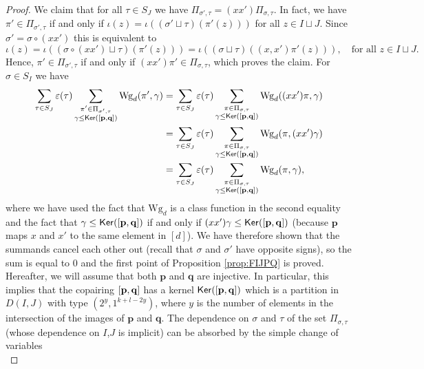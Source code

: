 \documentclass[11pt, a4paper, oneside, reqno]{amsart}
\newcommand{\copairpq}{{[{\bf p},{\bf q}]}}
\theoremstyle{remark}
\theoremstyle{definition}
\numberwithin{equation}{section}
\begin{document}
\begin{proof}
We claim that for all $\tau \in S_J$ we have $\Pi_{\sigma', \tau} = (xx')\Pi_{\sigma, \tau}$. In fact, we have $\pi' \in \Pi_{\sigma', \tau}$ if and only if $\iota(z) = \iota((\sigma'\sqcup\tau)(\pi'(z)))$ for all $z \in I \sqcup J$. Since $\sigma' = \sigma \circ (xx')$ this is equivalent to
$$
		\iota(z) = \iota((\sigma\circ (xx')\sqcup \tau)(\pi'(z))) = \iota((\sigma\sqcup \tau)((x,x')\pi'(z))), \quad \text{for all } z \in I \sqcup J.
$$
Hence, $\pi' \in \Pi_{\sigma', \tau}$ if and only if $(xx')\pi' \in \Pi_{\sigma, \tau}$, which proves the claim.
For $\sigma \in S_I$ we have
\begin{align*}
	\sum_{\tau \in S_J}\varepsilon(\tau)
	\sum_{\substack{\pi' \in \Pi_{\sigma',\tau} \\\gamma\leq {\sf Ker}(\copairpq)}}
	\text{Wg}_d(\pi', \gamma) &= \sum_{\tau \in S_J}\varepsilon(\tau)
	\sum_{\substack{\pi \in \Pi_{\sigma,\tau}   \\\gamma\leq {\sf Ker}(\copairpq)}}
	\text{Wg}_d((xx')\pi, \gamma)               \\
	&=\sum_{\tau \in S_J}\varepsilon(\tau)
	\sum_{\substack{\pi \in \Pi_{\sigma,\tau}   \\\gamma\leq {\sf Ker}(\copairpq)}}
	\text{Wg}_d(\pi, (xx')\gamma)               \\
	&= \sum_{\tau \in S_J}\varepsilon(\tau)
	\sum_{\substack{\pi \in \Pi_{\sigma,\tau}   \\\gamma\leq {\sf Ker}(\copairpq)}}
	\text{Wg}_d(\pi, \gamma),
\end{align*}
where we have used the fact that $\text{Wg}_d$ is a class function in the second equality and the fact that $\gamma \leq {\sf Ker}(\copairpq)$ if and only if $(xx')\gamma \leq {\sf Ker}(\copairpq)$ (because $\mathbf p$ maps $x$ and ${x'}$ to the same element in $[d]$). We have therefore shown that the summands cancel each other out (recall that $\sigma $ and $\sigma'$ have opposite signs), so the sum is equal to 0 and the first point of Proposition \ref{prop:FIJPQ} is proved.
Hereafter, we will assume that both $\mathbf p$ and $\mathbf q$ are injective. In particular, this implies that the copairing $\copairpq$ has a kernel ${\sf Ker}(\copairpq)$ which is a partition in $D(I,J)$ with type $(2^y, 1^{k+l-2y})$, where $y$ is the number of elements in the intersection of the images of $\mathbf p$ and $\mathbf q$.
The dependence on $\sigma$ and $\tau$ of the set $\Pi_{\sigma, \tau}$ (whose dependence on $I$,$J$ is implicit) can be absorbed by the simple change of variables
\begin{equation}

\end{equation}
\end{proof}
\end{document}
